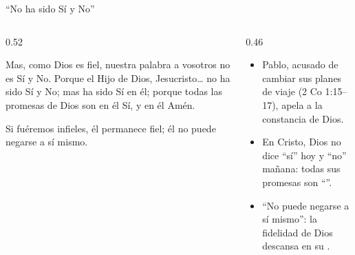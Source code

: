 \begin{frame}{``No ha sido Sí y No''}
\begin{columns}[t,onlytextwidth]
\begin{column}{0.52\textwidth}
\begin{cita}Mas, como Dios es fiel, nuestra palabra a vosotros no es Sí y No. Porque el Hijo de Dios, Jesucristo\ldots{} no ha sido Sí y No; mas ha sido Sí en él; porque todas las promesas de Dios son en él Sí, y en él Amén.\end{cita}
\begin{cita}Si fuéremos infieles, él permanece fiel; él no puede negarse a sí mismo.\end{cita}
\end{column}
\begin{column}{0.46\textwidth}\small
\begin{itemize}
\item Pablo, acusado de cambiar sus planes de viaje (2 Co 1:15--17), apela a la constancia de Dios.
\item En Cristo, Dios no dice ``sí'' hoy y ``no'' mañana: todas sus promesas son ``''.
\item ``No puede negarse a sí mismo'': la fidelidad de Dios descansa en su .
\end{itemize}
\end{column}
\end{columns}
\end{frame}

